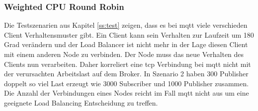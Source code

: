 
\subsubsection{Weighted CPU Round Robin} \label{ss:weighted-cpu}
Die Testszenarien aus Kapitel \ref{ss:test} zeigen, dass es bei \ac{mqtt} viele verschieden Client Verhaltensmuster gibt. Ein Client kann sein Verhalten zur Laufzeit um 180 Grad verändern und der Load Balancer ist nicht mehr in der Lage diesen Client mit einem anderen Node zu verbinden. Der Node muss das neue Verhalten des Clients nun verarbeiten.
Daher korreliert eine \ac{tcp} Verbindung bei \ac{mqtt} nicht mit der verursachten Arbeitslast auf dem Broker. In Szenario 2 haben 300 Publisher doppelt so viel Last erzeugt wie 3000 Subscriber und 1000 Publisher zusammen.
Die Anzahl der Verbindungen eines Nodes reicht im Fall \ac{mqtt} nicht aus um eine geeignete Load Balancing Entscheidung zu treffen.

